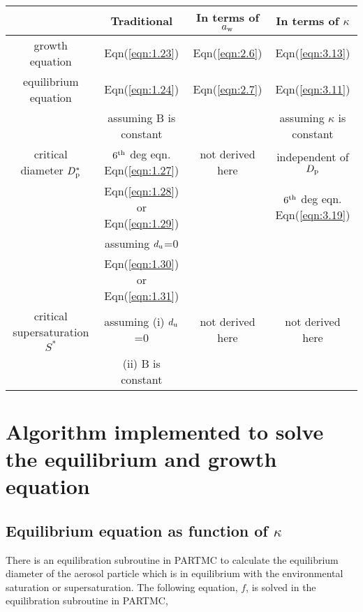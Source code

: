\documentclass[12pt]{article}
\begin{document}
\begin{tabular}{c | c | c | c } 
\hline
             &  Traditional  &   In terms of $a_{\rm w}$  &  In terms of $\kappa$ \\
\hline  \hline             
    growth equation  &  Eqn(\ref{eqn:1.23})   &   Eqn(\ref{eqn:2.6})   &    Eqn(\ref{eqn:3.13}) \\ 
\hline 
    equilibrium equation & Eqn(\ref{eqn:1.24})   &  Eqn(\ref{eqn:2.7})  &  Eqn(\ref{eqn:3.11})  \\
\hline    
              & assuming  B is constant &  &  assuming $\kappa$ is constant   \\
               critical diameter $D_{\rm p}^{*}$  &  $6^{\rm th}$ deg eqn.   Eqn(\ref{eqn:1.27}) & not derived here  &independent of $D_{\rm p}$ \\
                                                  & Eqn(\ref{eqn:1.28}) or Eqn(\ref{eqn:1.29})  &                    & $6^{\rm th}$ deg eqn. Eqn(\ref{eqn:3.19})   \\                               
  &  assuming $d_{\rm u}$=0  &    &    \\
                                                
                                               
\hline
 & Eqn(\ref{eqn:1.30}) or Eqn(\ref{eqn:1.31})  &              &                        \\
 critical supersaturation $S^{*}$   &  assuming (i) $d_{\rm u}$=0  &   not derived here  &  not derived here   \\
  & (ii) B is constant  & &  \\
\hline 
\end{tabular}

\section{Algorithm implemented to solve the equilibrium and growth equation}

\subsection{Equilibrium equation as function of $\kappa$}

There is an equilibration subroutine in PARTMC to calculate the equilibrium diameter of the aerosol particle which is in equilibrium with the environmental saturation or supersaturation.
The following equation, $f$, is solved in the equilibration subroutine in PARTMC,
\end{document}
